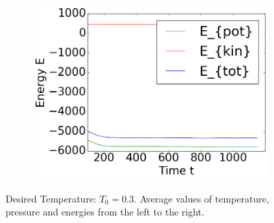 \begin{figure}[ht]
\begin{subfigure}{0.3\textwidth}
\end{subfigure}
\hfill
\begin{subfigure}{0.3\textwidth}
\includegraphics[width=\textwidth]{../dat/avEnergies_T0d3_F20d0_M100.png}
\end{subfigure}
\caption{
Desired Temperature: $T_0=0.3$.
Average values of temperature, pressure and energies from the left to the right.}
\label{9T0d3}
\end{figure}

